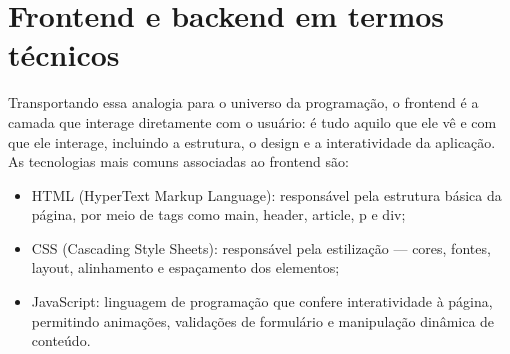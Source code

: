 \section{Frontend e backend em termos técnicos}

Transportando essa analogia para o universo da programação, o frontend é a camada que interage diretamente com o usuário: é tudo aquilo que ele vê e com que ele interage, incluindo a estrutura, o design e a interatividade da aplicação. As tecnologias mais comuns associadas ao frontend são:

\begin{itemize}
  \item HTML (HyperText Markup Language): responsável pela estrutura básica da página, por meio de tags como main, header, article, p e div;
\end{itemize}

\begin{itemize}
  \item CSS (Cascading Style Sheets): responsável pela estilização — cores, fontes, layout, alinhamento e espaçamento dos elementos;
\end{itemize}

\begin{itemize}
  \item JavaScript: linguagem de programação que confere interatividade à página, permitindo animações, validações de formulário e manipulação dinâmica de conteúdo.
\end{itemize}

